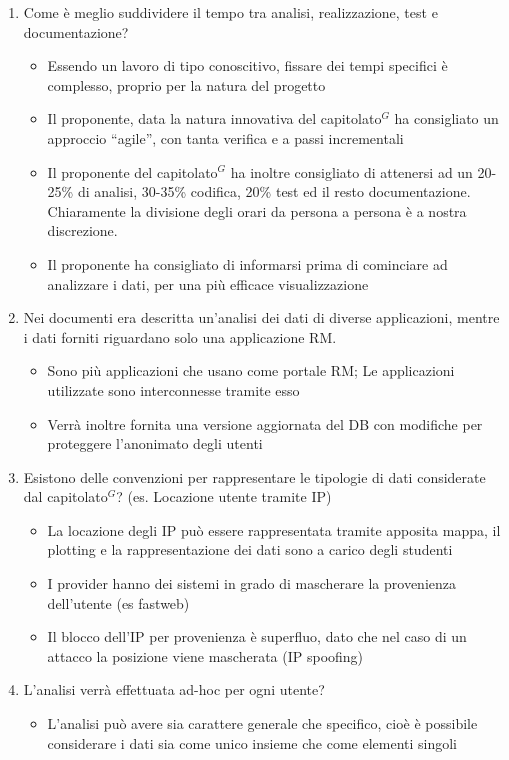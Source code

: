 \begin{enumerate}
	\item Come è meglio suddividere il tempo tra analisi, realizzazione, test e documentazione?
	\begin{itemize}
		\item Essendo un lavoro di tipo conoscitivo, fissare dei tempi specifici è complesso, proprio per la natura del progetto
		\item Il proponente, data la natura innovativa del capitolato$^{G}$ ha consigliato un approccio ``agile'', con tanta verifica e a passi incrementali
		\item Il proponente del capitolato$^{G}$ ha inoltre consigliato di attenersi ad un 20-25\% di analisi, 30-35\% codifica, 20\% test ed il resto documentazione. Chiaramente la divisione degli orari da persona a persona è a nostra discrezione.
		\item Il proponente ha consigliato di informarsi prima di cominciare ad analizzare i dati, per una più efficace visualizzazione
	\end{itemize}

	\item Nei documenti era descritta un'analisi dei dati di diverse applicazioni, mentre i dati forniti riguardano solo una applicazione RM.
	\begin{itemize}
		\item Sono più applicazioni che usano come portale RM; Le applicazioni utilizzate sono interconnesse tramite esso
		\item Verrà inoltre fornita una versione aggiornata del DB con modifiche per proteggere l'anonimato degli utenti
	\end{itemize}

	\item Esistono delle convenzioni per rappresentare le tipologie di dati considerate dal capitolato$^{G}$? (es. Locazione utente tramite IP)
	\begin{itemize}
		\item La locazione degli IP può essere rappresentata tramite apposita mappa, il plotting e la rappresentazione dei dati sono a carico degli studenti
		\item I provider hanno dei sistemi in grado di mascherare la provenienza dell'utente (es fastweb)
		\item Il blocco dell'IP per provenienza è superfluo, dato che nel caso di un attacco la posizione viene mascherata (IP spoofing)
	\end{itemize}

	\item L'analisi verrà effettuata ad-hoc per ogni utente?
	\begin{itemize}
		\item L'analisi può avere sia carattere generale che specifico, cioè è possibile considerare i dati sia come unico insieme che come elementi singoli
	\end{itemize}
\end{enumerate}

